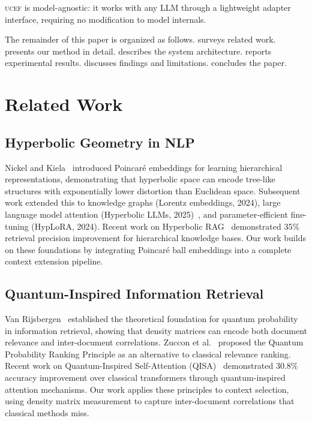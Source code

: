 \documentclass[11pt,letterpaper]{article}
\newcommand{\ucef}{\textsc{ucef}}
\begin{document}
\ucef{} is model-agnostic: it works with any LLM through a lightweight
adapter interface, requiring no modification to model internals.

The remainder of this paper is organized as follows.
 surveys related work.
 presents our method in detail.
 describes the system architecture.
 reports experimental results.
 discusses findings and limitations.
 concludes the paper.


\section{Related Work}
\label{sec:related}

\subsection{Hyperbolic Geometry in NLP}

Nickel and Kiela~\citep{nickel2017poincare} introduced Poincar\'{e}
embeddings for learning hierarchical representations, demonstrating that
hyperbolic space can encode tree-like structures with exponentially lower
distortion than Euclidean space.  Subsequent work extended this to knowledge
graphs (Lorentz embeddings, 2024), large language model attention
(Hyperbolic LLMs, 2025)~\citep{hyperbolicllm2025}, and parameter-efficient
fine-tuning (HypLoRA, 2024).  Recent work on Hyperbolic
RAG~\citep{hyperbolicrag2025} demonstrated 35\% retrieval precision
improvement for hierarchical knowledge bases.  Our work builds on these
foundations by integrating Poincar\'{e} ball embeddings into a complete
context extension pipeline.

\subsection{Quantum-Inspired Information Retrieval}

Van Rijsbergen~\citep{vanrijsbergen2004} established the theoretical
foundation for quantum probability in information retrieval, showing that
density matrices can encode both document relevance and inter-document
correlations.  Zuccon et al.~\citep{zuccon2009} proposed the Quantum
Probability Ranking Principle as an alternative to classical relevance
ranking.  Recent work on Quantum-Inspired Self-Attention
(QISA)~\citep{qisa2024} demonstrated 30.8\% accuracy improvement over
classical transformers through quantum-inspired attention mechanisms.  Our
work applies these principles to context selection, using density matrix
measurement to capture inter-document correlations that classical methods
miss.
\end{document}
